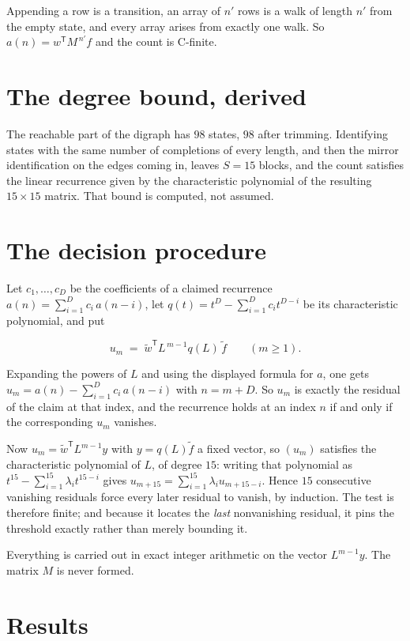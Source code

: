 \documentclass[11pt]{article}
\theoremstyle{definition}
\begin{document}
Appending a row is a transition, an array of $n'$ rows is a walk of length $n'$ from the empty state, and every array arises from exactly one walk. So $a(n) = w^{\mathsf T}M^{\,n'}f$ and the count is C-finite.

\section{The degree bound, derived}

The reachable part of the digraph has $98$ states, $98$ after trimming. Identifying states with the same number of completions of every length, and then the mirror identification on the edges coming in, leaves $S = 15$ blocks, and the count satisfies the linear recurrence given by the characteristic polynomial of the resulting $15\times15$ matrix. That bound is computed, not assumed.

\section{The decision procedure}

Let $c_1,\dots,c_D$ be the coefficients of a claimed recurrence $a(n) = \sum_{i=1}^{D} c_i\,a(n-i)$, let $q(t) = t^{D} - \sum_{i=1}^{D} c_i t^{D-i}$ be its characteristic polynomial, and put

\[u_m \;=\; \tilde w^{\mathsf T} L^{\,m-1} q(L)\,\tilde f \qquad (m \ge 1).\]

Expanding the powers of $L$ and using the displayed formula for $a$, one gets $u_m = a(n) - \sum_{i=1}^{D} c_i\,a(n-i)$ with $n = m + D$. So $u_m$ is exactly the residual of the claim at that index, and the recurrence holds at an index $n$ if and only if the corresponding $u_m$ vanishes.

Now $u_m = \tilde w^{\mathsf T} L^{m-1} y$ with $y = q(L)\tilde f$ a fixed vector, so $(u_m)$ satisfies the characteristic polynomial of $L$, of degree $15$: writing that polynomial as $t^{15} - \sum_{i=1}^{15} \lambda_i t^{15-i}$ gives $u_{m+15} = \sum_{i=1}^{15} \lambda_i u_{m+15-i}$. Hence $15$ consecutive vanishing residuals force every later residual to vanish, by induction. The test is therefore finite; and because it locates the {\itshape last} nonvanishing residual, it pins the threshold exactly rather than merely bounding it.

Everything is carried out in exact integer arithmetic on the vector $L^{m-1}y$. The matrix $M$ is never formed.

\section{Results}
\end{document}

